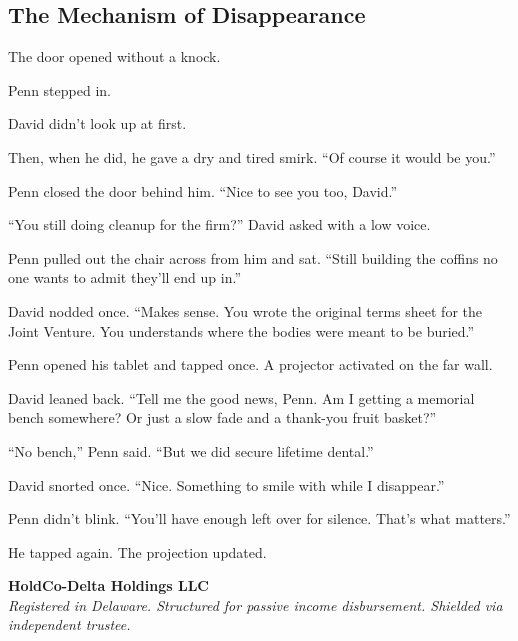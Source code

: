
\subsection{The Mechanism of Disappearance}

The door opened without a knock.

Penn stepped in.

David didn’t look up at first.

Then, when he did, he gave a dry and tired smirk.
``Of course it would be you.''

Penn closed the door behind him. ``Nice to see you too, David.''

``You still doing cleanup for the firm?'' David asked with a low voice.

Penn pulled out the chair across from him and sat. ``Still building the coffins no one wants 
to admit they’ll end up in.''

David nodded once. ``Makes sense. You wrote the original terms sheet for the Joint Venture. You 
understands where the bodies were meant to be buried.''

Penn opened his tablet and tapped once. A projector activated on the far wall.

David leaned back. ``Tell me the good news, Penn. Am I getting a memorial bench somewhere? 
Or just a slow fade and a thank-you fruit basket?''

``No bench,'' Penn said. ``But we did secure lifetime dental.''

David snorted once. ``Nice. Something to smile with while I disappear.''

Penn didn’t blink. ``You’ll have enough left over for silence. That’s what matters.''

He tapped again. The projection updated.

\textbf{HoldCo-Delta Holdings LLC} \\
\textit{Registered in Delaware. Structured for passive income disbursement. Shielded via independent trustee.}

\vspace{1em}

